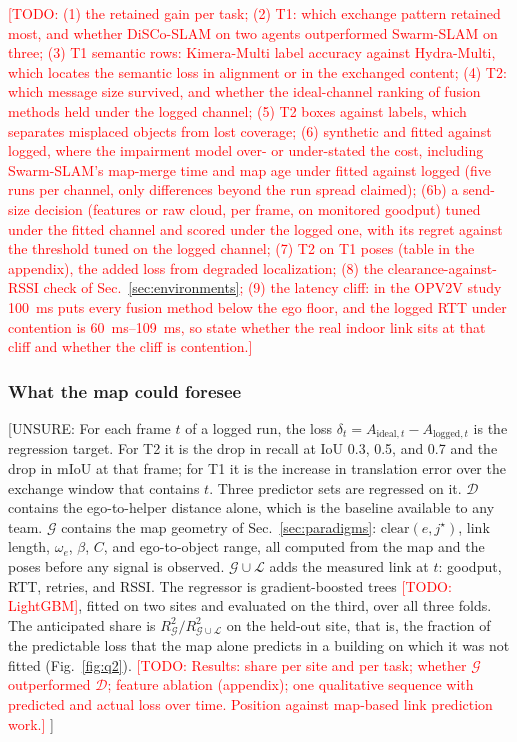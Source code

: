 \documentclass[journal]{IEEEtran}
\newcommand{\todo}[1]{\textcolor{red}{[TODO: #1]}}
\newcommand{\unsure}[1]{\textcolor{darkyellow}{[UNSURE: #1]}}
\begin{document}






\todo{(1) the retained gain per task;
(2) T1: which exchange pattern retained most, and whether DiSCo-SLAM
on two agents outperformed Swarm-SLAM on three; (3) T1 semantic rows:
Kimera-Multi label accuracy against Hydra-Multi, which locates the
semantic loss in alignment or in the exchanged content; (4) T2: which
message size survived, and whether the ideal-channel ranking of
fusion methods held under the logged channel; (5) T2 boxes against
labels, which separates misplaced objects from lost coverage; (6)
synthetic and fitted against logged, where the impairment model over-
or under-stated the cost, including Swarm-SLAM's map-merge time and
map age under fitted against logged (five runs per channel, only
differences beyond the run spread claimed); (6b) a send-size decision
(features or raw cloud, per frame, on monitored goodput) tuned under
the fitted channel and scored under the logged one, with its regret
against the threshold tuned on the logged channel; (7) T2 on T1 poses (table in the appendix),
the added loss from degraded localization; (8) the
clearance-against-RSSI check of Sec.~\ref{sec:environments}; (9) the
latency cliff: in the OPV2V study \SI{100}{\milli\second} puts every
fusion method below the ego floor, and the logged RTT under contention
is \SIrange{60}{109}{\milli\second}, so state whether the real indoor
link sits at that cliff and whether the cliff is contention.}

\subsubsection{What the map could foresee}
\label{sec:q2}

\unsure{For each frame $t$ of a logged run, the loss
$\delta_t = A_{\mathrm{ideal},t} - A_{\mathrm{logged},t}$ is the
regression target. For T2 it is the drop in recall at IoU 0.3, 0.5,
and 0.7 and the drop in mIoU at that frame; for T1 it is the increase
in translation error over the exchange window that contains $t$.
Three predictor sets are regressed on it. $\mathcal{D}$ contains the
ego-to-helper distance alone, which is the baseline available to any
team. $\mathcal{G}$ contains the map geometry of
Sec.~\ref{sec:paradigms}: $\mathrm{clear}(e,j^\star)$, link length,
$\omega_e$, $\beta$, $C$, and ego-to-object range, all computed from
the map and the poses before any signal is observed.
$\mathcal{G}\cup\mathcal{L}$ adds the measured link at $t$: goodput,
RTT, retries, and RSSI. The regressor is gradient-boosted trees
\todo{LightGBM}, fitted on two sites and evaluated on the third, over
all three folds. The anticipated share is
$R^2_{\mathcal{G}} / R^2_{\mathcal{G}\cup\mathcal{L}}$ on the held-out
site, that is, the fraction of the predictable loss that the map
alone predicts in a building on which it was not fitted
(Fig.~\ref{fig:q2}). \todo{Results: share per site and per task;
whether $\mathcal{G}$ outperformed $\mathcal{D}$; feature ablation
(appendix); one qualitative sequence with predicted and actual loss
over time. Position against map-based link prediction work.}
}
\end{document}

